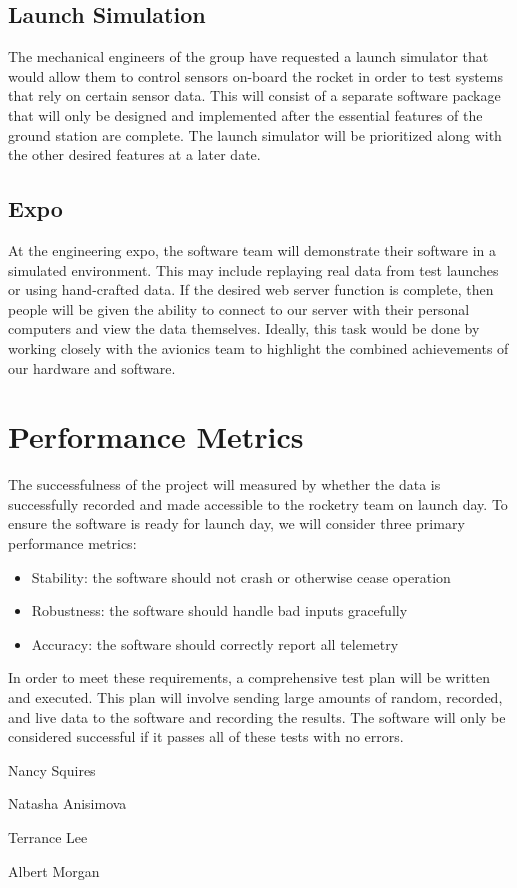\documentclass[10pt,journal,draftclsnofoot,onecolumn]{IEEEtran}
\begin{document}
	\subsection{Launch Simulation}
	
	The mechanical engineers of the group have requested a launch simulator that
	would allow them to control sensors on-board the rocket in order to test
	systems that rely on certain sensor data. This will consist of a separate
	software package that will only be designed and implemented after the
	essential features of the ground station are complete. The launch simulator
	will be prioritized along with the other desired features at a later date.

	\subsection{Expo}
	At the engineering expo, the software team will demonstrate their software
	in a simulated environment. This may include replaying real data from test launches
	or using hand-crafted data.
	If the desired web server function is complete, then people will be given the ability
	to connect to our server with their personal computers and view the data themselves.
	Ideally, this task would be done by working closely
	with the avionics team to highlight the combined achievements of our
	hardware and software.
	
	\section{Performance Metrics}
	
	The successfulness of the project will measured by whether the data
	is successfully recorded and made accessible to the rocketry team
	on launch day. To ensure the software is ready for launch day,
	we will consider three primary performance metrics:
	
	\begin{itemize}
		\item Stability: the software should not crash or otherwise cease operation
		\item Robustness: the software should handle bad inputs gracefully
		\item Accuracy: the software should correctly report all telemetry
	\end{itemize}
	
	In order to meet these requirements, a comprehensive test plan will
	be written and executed. This plan will involve sending large amounts
	of random, recorded, and live data to the software and recording the results.
	The software will only be considered successful if it passes all of these
	tests with no errors.

	\vspace{1in}
	\noindent Nancy Squires

	\vspace{1in}
	\noindent Natasha Anisimova

	\vspace{1in}
	\noindent Terrance Lee

	\vspace{1in}
	\noindent Albert Morgan\\
	
\end{document}
